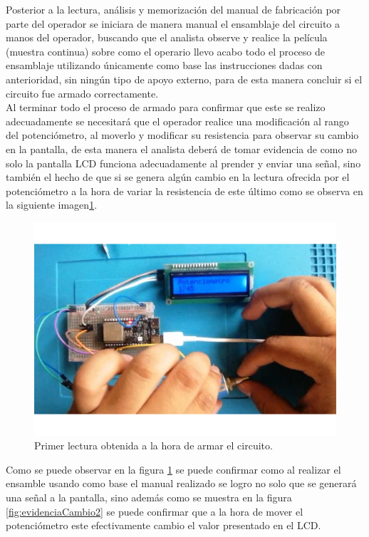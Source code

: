     Posterior a la  lectura, análisis y memorización del manual de fabricación por parte del operador se iniciara de manera manual el ensamblaje del circuito a manos del operador, buscando que el analista observe y realice la película (muestra continua) sobre como el operario llevo acabo todo el proceso de ensamblaje utilizando únicamente como base las instrucciones dadas con anterioridad, sin ningún tipo de apoyo externo, para de esta manera concluir si el circuito fue armado correctamente.
    \\Al terminar todo el proceso de armado para confirmar que este se realizo adecuadamente se necesitará que el operador realice una modificación al rango del potenciómetro, al moverlo y modificar su resistencia para observar su cambio en la pantalla, de esta manera el analista deberá de tomar evidencia de como no solo la pantalla LCD funciona adecuadamente al prender y enviar una señal, sino también el hecho de que si se genera algún cambio en la lectura ofrecida por el potenciómetro a la hora de variar la resistencia de este último como se observa en la siguiente imagen\ref{fig:evidenciaCambio1}.
                \begin{figure}[H]
        \centering
        \includegraphics[trim = {45mm 15mm 80mm 20mm},clip,scale=0.5]{19/Img/evidenciaCambio1.pdf}
        \caption{Primer lectura obtenida a la hora de armar el circuito.}
        \label{fig:evidenciaCambio1}
    \end{figure}
    Como se puede observar en la figura \ref{fig:evidenciaCambio1} se puede confirmar como al realizar el ensamble usando como base el manual realizado se logro no solo que se generará una señal a la pantalla, sino además como se muestra en la figura \ref{fig:evidenciaCambio2} se puede confirmar que a la hora de mover el potenciómetro este efectivamente cambio el valor presentado en el LCD.
